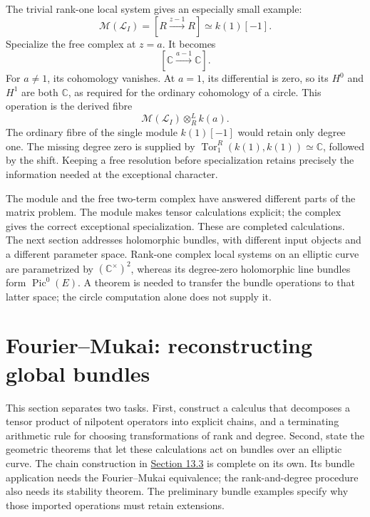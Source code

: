 \documentclass[11pt]{article}
\theoremstyle{remark}
\newcommand{\C}{\mathbb C}
\begin{document}
The trivial rank-one local system gives an especially small example:
\begin{equation}
\mathcal M(\mathcal L_I)
=[R\xrightarrow{z-1}R]\simeq k(1)[-1].
\label{circle:trivial}
\end{equation}
Specialize the free complex at \(z=a\). It becomes
\[
[\C\xrightarrow{a-1}\C].
\]
For \(a\ne1\), its cohomology vanishes. At \(a=1\), its differential is zero, so its \(H^0\) and \(H^1\) are both \(\C\), as required for the ordinary cohomology of a circle. This operation is the derived fibre
\[
\mathcal M(\mathcal L_I)\otimes_R^L k(a).
\]
The ordinary fibre of the single module \(k(1)[-1]\) would retain only degree one. The missing degree zero is supplied by
\(\operatorname{Tor}_1^R(k(1),k(1))\simeq\C\), followed by the shift. Keeping a free resolution before specialization retains precisely the information needed at the exceptional character.

The module and the free two-term complex have answered different parts of the matrix problem. The module makes tensor calculations explicit; the complex gives the correct exceptional specialization. These are completed calculations. The next section addresses holomorphic bundles, with different input objects and a different parameter space. Rank-one complex local systems on an elliptic curve are parametrized by \((\C^\times)^2\), whereas its degree-zero holomorphic line bundles form \(\operatorname{Pic}^0(E)\). A theorem is needed to transfer the bundle operations to that latter space; the circle computation alone does not supply it.

\section{Fourier--Mukai: reconstructing global bundles}
\label{categorical:section}

This section separates two tasks. First, construct a calculus that decomposes a tensor product of nilpotent operators into explicit chains, and a terminating arithmetic rule for choosing transformations of rank and degree. Second, state the geometric theorems that let these calculations act on bundles over an elliptic curve. The chain construction in \hyperref[jordan-tensor-calculus]{Section 13.3} is complete on its own. Its bundle application needs the Fourier--Mukai equivalence; the rank-and-degree procedure also needs its stability theorem. The preliminary bundle examples specify why those imported operations must retain extensions.
\end{document}
